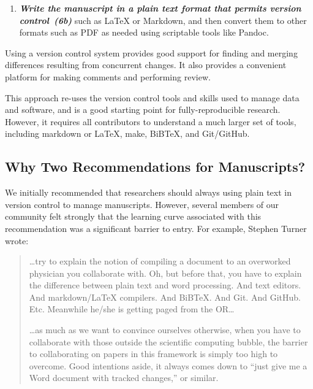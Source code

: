 \documentclass[10pt,letterpaper]{article}
\newcommand{\withurl}[2]{{#1}}
\newcommand{\practice}[2]{\textbf{\emph{{#2}~({#1})}}}
\begin{document}
\begin{enumerate}

\item

  \practice{6b}{Write the manuscript in a plain text format that
  permits version control} such as
  \withurl{LaTeX}{http://www.latex-project.org/} or
  \withurl{Markdown}{http://daringfireball.net/projects/markdown/},
  and then convert them to other formats such as PDF as needed using
  scriptable tools like \withurl{Pandoc}{http://pandoc.org/}.

\end{enumerate}

Using a version control system provides good support for finding and
merging differences resulting from concurrent changes. It also
provides a convenient platform for making comments and performing
review.

This approach re-uses the version control tools and skills used to
manage data and software, and is a good starting point for
fully-reproducible research. However, it requires all contributors to
understand a much larger set of tools, including markdown or LaTeX,
make, BiBTeX, and Git/GitHub.

\subsection*{Why Two Recommendations for Manuscripts?}

We initially recommended that researchers should always using plain
text in version control to manage manuscripts.  However, several
members of our community felt strongly that the learning curve
associated with this recommendation was a significant barrier to
entry.  For example, Stephen Turner wrote:

\begin{quote}

  {\ldots}try to explain the notion of compiling a document to an
  overworked physician you collaborate with. Oh, but before that, you
  have to explain the difference between plain text and word
  processing. And text editors. And markdown/LaTeX compilers. And
  BiBTeX. And Git. And GitHub. Etc. Meanwhile he/she is getting paged
  from the OR{\ldots}

  {\ldots}as much as we want to convince ourselves otherwise, when you
  have to collaborate with those outside the scientific computing
  bubble, the barrier to collaborating on papers in this framework is
  simply too high to overcome. Good intentions aside, it always comes
  down to ``just give me a Word document with tracked changes,'' or
  similar.

\end{quote}
\end{document}
